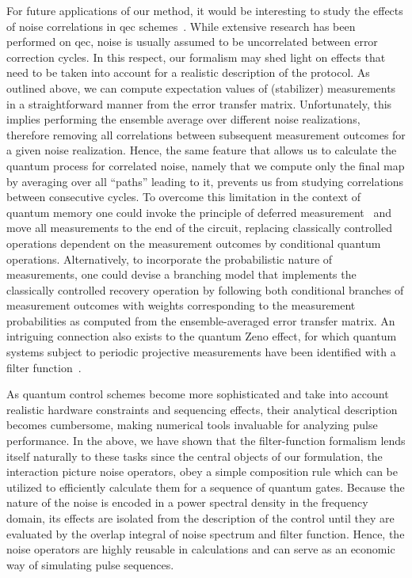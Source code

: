 For future applications of our method, it would be interesting to study the effects of noise correlations in \gls{qec} schemes~\cite{Devitt2013,Ng2011,Nickerson2019}. %
While extensive research has been performed on \gls{qec}, noise is usually assumed to be uncorrelated between error correction cycles.
In this respect, our formalism may shed light on effects that need to be taken into account for a realistic description of the protocol.
As outlined above, we can compute expectation values of (stabilizer) measurements in a straightforward manner from the error transfer matrix.
Unfortunately, this implies performing the ensemble average over different noise realizations, therefore removing all correlations between subsequent measurement outcomes for a given noise realization.
Hence, the same feature that allows us to calculate the quantum process for correlated noise, namely that we compute only the final map by averaging over all \enquote{paths} leading to it, prevents us from studying correlations between consecutive cycles.
To overcome this limitation in the context of quantum memory one could invoke the principle of deferred measurement~\cite{Nielsen2011} and move all measurements to the end of the circuit, replacing classically controlled operations dependent on the measurement outcomes by conditional quantum operations.
Alternatively, to incorporate the probabilistic nature of measurements, one could devise a branching model that implements the classically controlled recovery operation by following both conditional branches of measurement outcomes with weights corresponding to the measurement probabilities as computed from the ensemble-averaged error transfer matrix.
An intriguing connection also exists to the quantum Zeno effect, for which quantum systems subject to periodic projective measurements have been identified with a filter function~\cite{Kofman2000,Kofman2001,Chaudhry2016}.

As quantum control schemes become more sophisticated and take into account realistic hardware constraints and sequencing effects, their analytical description becomes cumbersome, making numerical tools invaluable for analyzing pulse performance.
In the above, we have shown that the filter-function formalism lends itself naturally to these tasks since the central objects of our formulation, the interaction picture noise operators, obey a simple composition rule which can be utilized to efficiently calculate them for a sequence of quantum gates.
Because the nature of the noise is encoded in a power spectral density in the frequency domain, its effects are isolated from the description of the control until they are evaluated by the overlap integral of noise spectrum and filter function.
Hence, the noise operators are highly reusable in calculations and can serve as an economic way of simulating pulse sequences.

